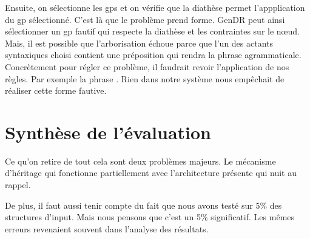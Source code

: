 Ensuite, on sélectionne les gps et on vérifie que la diathèse permet l'appplication du gp sélectionné. C'est là que le problème prend forme. GenDR peut ainsi sélectionner un gp fautif qui respecte la diathèse et les contraintes sur le n\oe{}ud. Mais, il est possible que l'arborisation échoue parce que l'un des actants syntaxiques choisi contient une préposition qui rendra la phrase agrammaticale. Concrètement pour régler ce problème, il faudrait revoir l'application de nos règles. Par exemple la phrase . Rien dans notre système nous empêchait de réaliser cette forme fautive.

\section{Synthèse de l'évaluation}


Ce qu'on retire de tout cela sont deux problèmes majeurs. Le mécanisme d'héritage qui fonctionne partiellement avec l'architecture présente qui nuit au rappel.

De plus, il faut aussi tenir compte du fait que nous avons testé sur 5\% des structures d'input. Mais nous pensons que c'est un 5\% significatif. Les mêmes erreurs revenaient souvent dans l'analyse des résultats.


